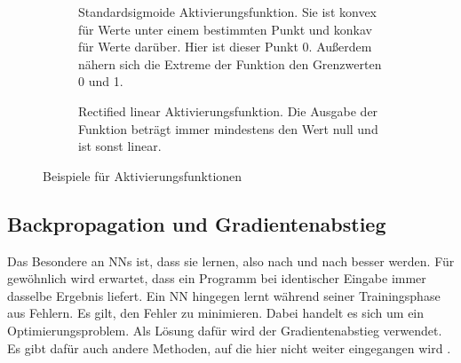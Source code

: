 \begin{figure}
  \centering
  \begin{subfigure}[t]{.49\textwidth}
    \centering
    \caption{Standardsigmoide Aktivierungsfunktion. Sie ist konvex für Werte unter einem bestimmten Punkt und konkav für Werte darüber. Hier ist dieser Punkt 0. Außerdem nähern sich die Extreme der Funktion den Grenzwerten 0 und 1.}
    \label{fig:sigmoid}
  \end{subfigure}%
  \hfill%
  \begin{subfigure}[t]{.49\textwidth}
    \centering
    \caption{Rectified linear Aktivierungsfunktion. Die Ausgabe der Funktion beträgt immer mindestens den Wert null und ist sonst linear.}
    \label{fig:Relu}
  \end{subfigure}
  \caption{Beispiele für Aktivierungsfunktionen}
  \label{fig:activationfunction}
\end{figure}

\subsection{Backpropagation und Gradientenabstieg}
\label{chap:bpGradient}
Das Besondere an \acp{NN} ist, dass sie lernen, also nach und nach besser werden. Für gewöhnlich wird erwartet, dass ein Programm bei identischer Eingabe immer dasselbe Ergebnis liefert. Ein \ac{NN} hingegen lernt während seiner Trainingsphase aus Fehlern. Es gilt, den Fehler zu minimieren. Dabei handelt es sich um ein Optimierungsproblem. Als Lösung dafür wird der Gradientenabstieg verwendet. Es gibt dafür auch andere Methoden, auf die hier nicht weiter eingegangen wird \cite{StockfishNNUE}.

